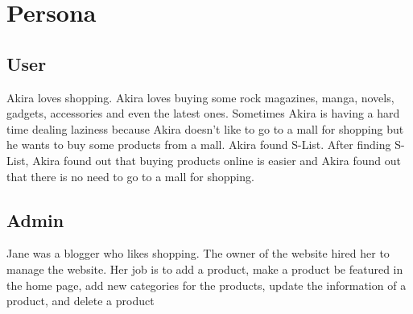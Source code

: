 \documentclass{report}
\begin{document}
\section{Persona}
\subsection{User}
Akira loves shopping. Akira loves buying some rock magazines, manga, novels, gadgets, accessories and even the latest ones. Sometimes Akira is having a hard time dealing laziness because Akira doesn’t like to go to a mall for shopping but he wants to buy some products from a mall. Akira found S-List. After finding S-List, Akira found out that buying products online is easier and Akira found out that there is no need to go to a mall for shopping.

\subsection{Admin}
Jane was a blogger who likes shopping. The owner of the website hired her to manage the website. Her job is to add a product, make a product be featured in the home page, add new categories for the products, update the information of a product, and delete a product
\end{document}
